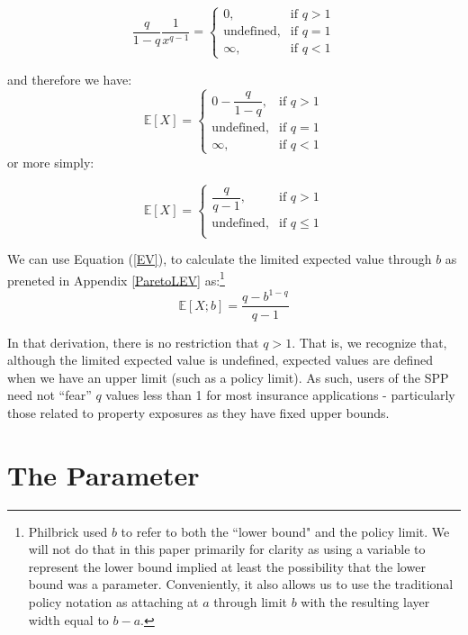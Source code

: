 \documentclass[]{article} %
\begin{document}
\[
    \frac{q}{1-q} \dfrac{1}{x^{q-1}} = 
\begin{cases}
    0,& \text{if } q > 1\\
    \text{undefined},& \text{if } q = 1\\         
    \infty, & \text{if }q < 1
\end{cases}
\]

and therefore we have: 
\[
    \mathbb{E}[X]  = 
\begin{cases}
    0 - \dfrac{q}{1-q},& \text{if } q > 1\\
    \text{undefined},& \text{if } q = 1\\         
    \infty, & \text{if }q < 1
\end{cases}
\]
or more simply:

\begin{equation}
\mathbb{E}[X]  = 
\begin{cases}
\dfrac{q}{q-1},& \text{if } q > 1\\
\text{undefined},& \text{if } q \leq 1\\         
\end{cases}
\end{equation}


We can use Equation (\ref{EV}), to calculate the limited expected value through $b$
as preneted in Appendix \ref{ParetoLEV} as:\footnote{Philbrick used $b$ to refer to both the ``lower bound" and the policy limit. We will not do that in this paper primarily for clarity as using a variable to represent the lower bound implied at least the possibility that the lower bound was a parameter. Conveniently, it also allows us  to use the traditional policy notation as attaching at $a$ through limit $b$ with the resulting layer width equal to $b - a$.} 
\begin{equation}
	\mathbb{E}[X;b] = \frac{q - b^{1-q}}{q-1}
\end{equation}

In that derivation, there is no restriction that $q > 1$. That is, we recognize that, although the limited expected value is undefined, expected values are defined when we have an upper limit (such as a policy limit). As such, users of the SPP need not ``fear'' $q$ values less than 1 for most insurance applications - particularly those related to property exposures as they have fixed upper bounds.

\section{The Parameter}
\end{document}
